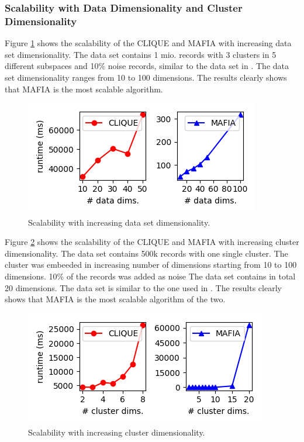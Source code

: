\subsubsection{Scalability with Data Dimensionality and Cluster Dimensionality}
Figure \ref{fig:data_dimensionality_vs_runtime} shows the scalability of the CLIQUE and MAFIA with increasing data set dimensionality. The data set contains 1 mio. records with 3 clusters in 5 different subspaces and 10\% noise records, similar to the data set in \cite{mafia}. The data set dimensionality ranges from 10 to 100 dimensions. The results clearly shows that MAFIA is the most scalable algorithm.
\begin{figure}[H]
    \vspace*{-0.5cm}
    \centering
    \includegraphics[scale=0.45]{figures/data_dimensionality_vs_runtime.png}
    \caption{Scalability with increasing data set dimensionality.}
    \label{fig:data_dimensionality_vs_runtime}
    \vspace*{-0.5cm}
\end{figure}

Figure \ref{fig:cluster_dimensionality_vs_runtime} shows the scalability of the CLIQUE and MAFIA with increasing cluster dimensionality. The data set contains 500k records with one single cluster. The cluster was embeeded in increasing number of dimensions starting from 10 to 100 dimensions. 10\% of the records was added as noise The data set contains in total 20 dimensions. The data set is similar to the one used in \cite{mafia}. The results clearly shows that MAFIA is the most scalable algorithm of the two.
\begin{figure}[H]
    \vspace*{-0.5cm}
    \centering
    \includegraphics[scale=0.45]{figures/cluster_dimensionality_vs_runtime.png}
    \caption{Scalability with increasing cluster dimensionality.}
    \label{fig:cluster_dimensionality_vs_runtime}
    \vspace*{-0.5cm}
\end{figure}

